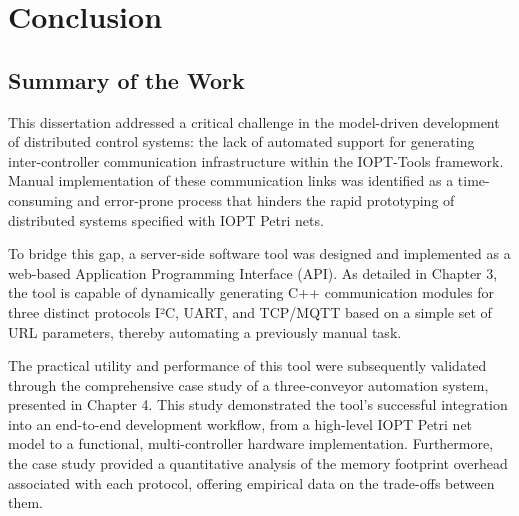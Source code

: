 
%

\chapter{Conclusion}
\label{cha:conclusion}

\section{Summary of the Work}
\label{sec:summary}

This dissertation addressed a critical challenge in the model-driven development of distributed control systems: the lack of automated support for generating inter-controller communication infrastructure within the IOPT-Tools framework. Manual implementation of these communication links was identified as a time-consuming and error-prone process that hinders the rapid prototyping of distributed systems specified with IOPT Petri nets.

To bridge this gap, a server-side software tool was designed and implemented as a web-based Application Programming Interface (API). As detailed in Chapter 3, the tool is capable of dynamically generating C++ communication modules for three distinct protocols I²C, UART, and TCP/MQTT                                                                                                                                                                                                                                                                                                                                                                                                                                                                                                                                                      based on a simple set of URL parameters, thereby automating a previously manual task.

The practical utility and performance of this tool were subsequently validated through the comprehensive case study of a three-conveyor automation system, presented in Chapter 4. This study demonstrated the tool's successful integration into an end-to-end development workflow, from a high-level IOPT Petri net model to a functional, multi-controller hardware implementation. Furthermore, the case study provided a quantitative analysis of the memory footprint overhead associated with each protocol, offering empirical data on the trade-offs between them.


